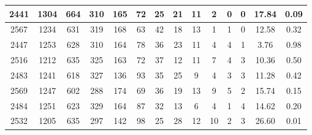\documentclass[12pt,a4paper]{article}
\begin{document}
\begin{center}
\begin{tabular}{|c|c|c|c|c|c|c|c|c|c|c|c|c|c|}
2441 & 1304 & 664 & 310 & 165 & 72 & 25 & 21 & 11 & 2 & 0 & 0 & 17.84 &  0.09\\ \hline
2567 & 1234 & 631 & 319 & 168 & 63 & 42 & 18 & 13 & 1 & 1 & 0 & 12.58 &  0.32\\ \hline
2447 & 1253 & 628 & 310 & 164 & 78 & 36 & 23 & 11 & 4 & 4 & 1 &  3.76 &  0.98\\ \hline
2516 & 1212 & 635 & 325 & 163 & 72 & 37 & 12 & 11 & 7 & 4 & 3 & 10.36 &  0.50\\ \hline
2483 & 1241 & 618 & 327 & 136 & 93 & 35 & 25 & 9 & 4 & 3 & 3 & 11.28 &  0.42\\ \hline
2569 & 1247 & 602 & 288 & 174 & 69 & 36 & 19 & 13 & 9 & 5 & 2 & 15.74 &  0.15\\ \hline
2484 & 1251 & 623 & 329 & 164 & 87 & 32 & 13 & 6 & 4 & 1 & 4 & 14.62 &  0.20\\ \hline
2532 & 1205 & 635 & 297 & 142 & 98 & 25 & 28 & 12 & 10 & 2 & 3 & 26.60 &  0.01\\ \hline
\end{tabular}
\end{center}
\end{document}
